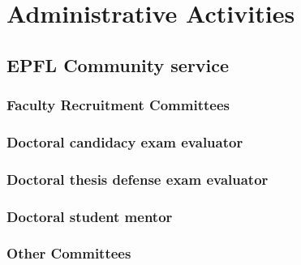\chapter{Administrative Activities}
\section{EPFL Community service}

\subsection{Faculty Recruitment Committees}

\subsection{Doctoral candidacy exam evaluator}

\subsection{Doctoral thesis defense exam evaluator}

\subsection{Doctoral student mentor}

\subsection{Other Committees}
